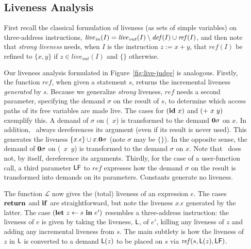 \subsection{Liveness Analysis}
First recall the classical formulation of liveness (as sets of simple variables)
on three-address instructions,
$
\mathit{live}_\mathit{in}(I) = \mathit{live}_\mathit{out}(I)
     \setminus \mathit{def\/}(I)
     \cup   \mathit{ref\/}(I)
$,
and then note that {\em strong liveness} needs, when $I$ is the instruction $z:=x+y$,
that $\mathit{ref}(I)$ be refined to
$\{x,y\}$ if $z \in\mathit{live}_\mathit{out}(I)$ and $\{\}$ otherwise.

Our liveness analysis formulated in Figure~\ref{fig:live-judge}
is analogous.
Firstly, the function $\mathit{ref}$, when given a statement $s$,
returns the incremental liveness {\em generated} by $s$.
Because we generalize {\em strong} liveness, $\mathit{ref}$ needs a second parameter,
specifying the demand $\sigma$ on the result of $s$,
to determine which access paths of its free variables are made live.
The cases for $(\mbox{$\mathbf{ id}$}\ x)$ and $(\mbox{$\mathbf{ +}$}\ x\ y)$ exemplify this.
A demand  of  $\sigma$  on  (\CAR~$x$)  is  transformed  to  the  demand
$\mathbf{0}\sigma$  on  $x$.   In  addition, \CAR\  always  dereferences  its
argument (even if its result is never used).
This generates the liveness  $\{x.\epsilon\} \cup  x.\mathbf{0}\sigma$
(note $\sigma$ may be $\{\}$).
In the opposite  sense, the  demand  of $\mathbf{0}\sigma$  on
(\CONS~$x$~$y$) is  transformed to the  demand $\sigma$ on  $x$.  Note
that \CONS\ does not, by itself, dereference its arguments.
Thirdly, for the case of a user-function call, a third parameter $\mathsf{LF}$ to 
$\mathit{ref}$
expresses how the demand $\sigma$ on the result is transformed into demands on its parameters.
Constants generate no liveness.

The function $\mathcal{L}$ now gives the (total) liveness of an expression $e$.
The cases $\mbox{$\mathbf{ return}$}$ and $\mbox{$\mathbf{ if}$}$ are straightforward, but note the liveness $x.\epsilon$ generated
by the latter.
The case $(\LET\ z\leftarrow s\ \IN\ e')$
resembles a three-address instruction:
the liveness of $e$ is given by taking the liveness, $\mathsf{L}$, of $e'$,
killing any liveness of $z$ and adding any incremental liveness from $s$.
The main subtlety is how the liveness of $z$ in $\mathsf{L}$ is converted to a demand $\mathsf{L}(z)$ to be
placed on $s$ via $\mathit{ref}(s,\mathsf{L}(z),\mathsf{LF})$.

